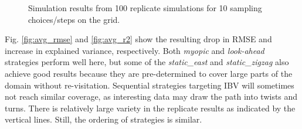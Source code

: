 \documentclass[aoas]{imsart}
\begin{document}
\begin{figure}[h!]
\caption{Simulation results from 100 replicate simulations for 10
  sampling choices/steps on the grid.} 
\label{fig:sim_results}
\end{figure}

Fig. \ref{fig:avg_rmse} and \ref{fig:avg_r2} show the resulting drop in RMSE and increase in explained variance, respectively. Both \textit{myopic} and \textit{look-ahead} strategies perform well here, but some of the \textit{static\_east} and \textit{static\_zigzag} also achieve good results because they are pre-determined to cover large parts of the domain without re-visitation. Sequential strategies targeting IBV will sometimes not reach similar coverage, as interesting data may draw the path into twists and turns. There is relatively large variety in the replicate results as indicated by the vertical lines. Still, the ordering of strategies is similar.
\end{document}

